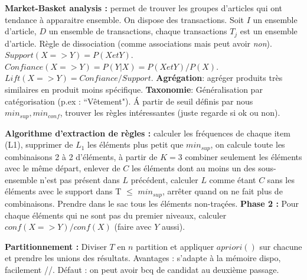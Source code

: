 \documentclass[9pt,a4paper]{report}
\begin{document}
\textbf{Market-Basket analysis :} permet de trouver les groupes d'articles qui ont tendance à apparaitre ensemble. On dispose des transactions. Soit $I$ un ensemble d'article, $D$ un ensemble de transactions, chaque transactions $T_j$ est un ensemble d'article. Règle de dissociation (comme associations mais peut avoir \textit{non}).
$Support(X => Y) = P ( X et Y )$.
$Confiance( X =>Y ) = P ( Y | X ) = P ( X et Y ) / P (X)$.
$Lift(X => Y)= Confiance / Support$. \textbf{Agrégation}: agréger produits très similaires en produit moins spécifique. \textbf{Taxonomie}: Généralisation par catégorisation (p.ex : “Vêtement"). Á partir de seuil définis par nous $min_{sup}, min_{conf}$, trouver les règles intéressantes (juste regarde si ok ou non).

\textbf{Algorithme d'extraction de règles :} calculer les fréquences de chaque item (L1), supprimer de $L_1$ les éléments plus petit que $min_{sup}$, on calcule toute les combinaisons 2 à 2 d'éléments, à partir de $K=3$ combiner seulement les éléments avec le même départ, enlever de $C$ les éléments dont au moins un des sous-ensemble n'est pas présent dans $L$ précédent, calculer $L$ comme étant $C$ sans les éléments avec le support dans T $\leq$ $min_{sup}$, arrêter quand on ne fait plus de combinaisons. Prendre dans le sac tous les éléments non-traçées.
\textbf{Phase 2 :} Pour chaque éléments qui ne sont pas du premier niveaux, calculer $conf(X=>Y)/conf(X)$ (faire avec $Y$ aussi).

\textbf{Partitionnement :} Diviser $T$ en $n$ partition et appliquer $apriori()$ sur chacune et prendre les unions des résultats. Avantages : s'adapte à la mémoire dispo, facilement //. Défaut : on peut avoir bcq de candidat au deuxième passage.
\end{document}
